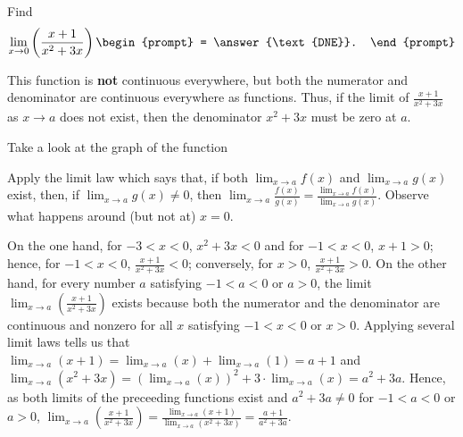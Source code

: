 \documentclass{ximera}
\author{Gregory Hartman \and Matthew Carr}
\begin{document}
\begin{exercise}



  Find 
  \[
  \lim_{x\to0} \left(\frac{x+1}{x^2+3x}\right)
  \begin{prompt}
  = \answer{\text{DNE}}.
  \end{prompt}
  \]
    \begin{hint}
      This function is \textbf{not} continuous everywhere, but both the numerator and denominator are continuous everywhere as functions. Thus, if the limit of $\frac{x+1}{x^2+3x}$ as $x\to a$ does not exist, then the denominator $x^2+3x$ must be zero at $a$.
    \end{hint}
     \begin{hint}
    Take a look at the graph of the function
    \begin{center}
      \end{center}
     Apply the limit law which says that, if both $\lim_{x\to a}f(x)$ and $\lim_{x\to a}g(x)$ exist, then, if $\lim_{x\to a}g(x)\ne0$, then $\lim_{x\to{a}}\frac{f(x)}{g(x)}=\frac{\lim_{x\to a}f(x)}{\lim_{x\to{a}}g(x)}$. Observe what happens around (but not at) $x=0$.
    \end{hint}
    \begin{hint}
     On the one hand, for $-3<x<0$, $x^2+3x<0$ and for $-1<x<0$, $x+1>0$; hence, for $-1<x<0$, $\frac{x+1}{x^2+3x}<0$; conversely, for $x>0$, $\frac{x+1}{x^2+3x}>0$. On the other hand, for every number $a$ satisfying $-1<a<0$ or $a>0$, the limit  $\lim_{x\to a}\left({\frac{x+1}{x^2+3x}}\right)$ exists because both the numerator and the denominator are continuous and nonzero for all $x$ satisfying $-1<x<0$ or $x>0$. Applying several limit laws tells us that $\lim_{x\to a}\left({x+1}\right)=\lim_{x\to a}(x)+\lim_{x\to a}\left({1}\right)=a+1$ and $\lim_{x\to a}\left({x^2+3x}\right)=\left(\lim_{x\to a}(x)\right)^2+3\cdot\lim_{x\to a}(x)=a^2+3a$. Hence, as both limits of the preceeding functions exist and $a^2+3a\ne0$ for $-1<a<0$ or $a>0$, $\lim_{x\to a}\left({\frac{x+1}{x^2+3x}}\right)=\frac{\lim_{x\to a}\left({x+1}\right)}{\lim_{x\to a}\left({x^2+3x}\right)}=\frac{a+1}{a^2+3a}$.
     

\end{hint}
\end{exercise}
\end{document}
